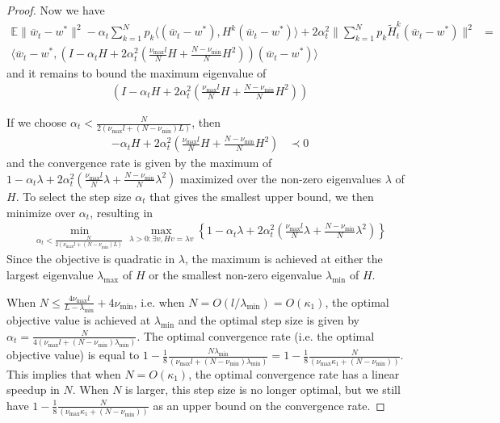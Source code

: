 \begin{proof}
	Now we have 
	\begin{align*}
	\mathbb{E}\|\overline{w}_{t}-w^{\ast}\|^{2}-\alpha_{t}\sum_{k=1}^{N}p_{k}\langle(\overline{w}_{t}-w^{\ast}),H^{k}(\overline{w}_{t}-w^{\ast})\rangle+2\alpha_{t}^{2}\|\sum_{k=1}^{N}p_{k}\tilde{H}_{t}^{k}(\overline{w}_{t}-w^{\ast})\|^{2} & =\\
	\langle\overline{w}_{t}-w^{\ast},(I-\alpha_{t}H+2\alpha_{t}^{2}(\frac{\nu_{\max}l}{N}H+\frac{N-\nu_{\min}}{N}H^{2}))(\overline{w}_{t}-w^{\ast})\rangle
	\end{align*}
	and it remains to bound the maximum eigenvalue of 
	\begin{align*}
	(I-\alpha_{t}H+2\alpha_{t}^{2}(\frac{\nu_{\max}l}{N}H+\frac{N-\nu_{\min}}{N}H^{2}))
	\end{align*}
	
	If we choose $\alpha_{t}<\frac{N}{2(\nu_{\max}l+(N-\nu_{\min})L)}$,
	then 
	\begin{align*}
	-\alpha_{t}H+2\alpha_{t}^{2}(\frac{\nu_{\max}l}{N}H+\frac{N-\nu_{\min}}{N}H^{2}) & \prec0
	\end{align*}
	and the convergence rate is given by the maximum of $1-\alpha_{t}\lambda+2\alpha_{t}^{2}(\frac{\nu_{\max}l}{N}\lambda+\frac{N-\nu_{\min}}{N}\lambda^{2})$
	maximized over the non-zero eigenvalues $\lambda$ of $H$. To select
	the step size $\alpha_{t}$ that gives the smallest upper bound, we
	then minimize over $\alpha_{t}$, resulting in 
	\begin{align*}
	\min_{\alpha_{t}<\frac{N}{2(\nu_{\max}l+(N-\nu_{\min})L)}}\max_{\lambda>0:\exists v,Hv=\lambda v}\left\{ 1-\alpha_{t}\lambda+2\alpha_{t}^{2}(\frac{\nu_{\max}l}{N}\lambda+\frac{N-\nu_{\min}}{N}\lambda^{2})\right\} 
	\end{align*}
	Since the objective is quadratic in $\lambda$, the maximum is achieved
	at either the largest eigenvalue $\lambda_{\max}$ of $H$ or the
	smallest non-zero eigenvalue $\lambda_{\min}$ of $H$. 
	
	When $N\leq\frac{4\nu_{\max}l}{L-\lambda_{\min}}+4\nu_{\min}$, i.e.
	when $N=O(l/\lambda_{\min})=O(\kappa_{1})$, the optimal objective
	value is achieved at $\lambda_{\min}$ and the optimal step size is
	given by $\alpha_{t}=\frac{N}{4(\nu_{\max}l+(N-\nu_{\min})\lambda_{\min})}$.
	The optimal convergence rate (i.e. the optimal objective value) is
	equal to $1-\frac{1}{8}\frac{N\lambda_{\min}}{(\nu_{\max}l+(N-\nu_{\min})\lambda_{\min})}=1-\frac{1}{8}\frac{N}{(\nu_{\max}\kappa_{1}+(N-\nu_{\min}))}$.
	This implies that when $N=O(\kappa_{1})$, the optimal convergence
	rate has a linear speedup in $N$. When $N$ is larger, this step
	size is no longer optimal, but we still have $1-\frac{1}{8}\frac{N}{(\nu_{\max}\kappa_{1}+(N-\nu_{\min}))}$
	as an upper bound on the convergence rate. 
	

\end{proof}
